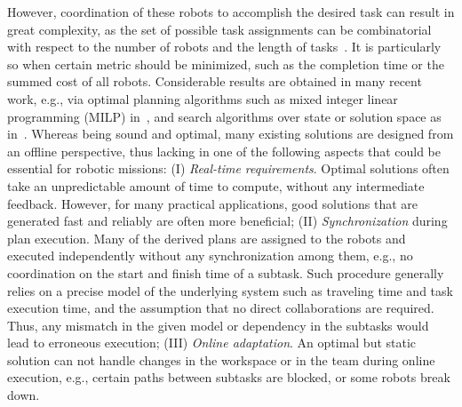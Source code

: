 However, coordination of these robots to accomplish the desired task can result in great complexity,
as the set of possible task assignments can be combinatorial with respect to the number of robots
and the length of tasks~\cite{toth2002overview}.
It is particularly so when certain metric should be minimized,
such as the completion time or the summed cost of all robots.
Considerable results are obtained in many recent work, e.g.,
via optimal planning algorithms
such as mixed integer linear programming (MILP) in~\cite{luo2021temporal,
 sahin2019multirobot, jones2019scratchs},
and search algorithms over state or solution space as
in~\cite{kantaros2020stylus, schillinger2018simultaneous, luo2021abstraction}.
Whereas being sound and optimal,
many existing solutions are designed from an offline perspective,
thus lacking in one of the following aspects that could be essential for robotic missions:
(I) \emph{Real-time requirements}.
Optimal solutions often take an unpredictable amount of time to compute,
without any intermediate feedback.
However, for many practical applications,
good solutions that are generated fast and reliably are often more beneficial;
(II) \emph{Synchronization} during plan execution.
Many of the derived plans are assigned to the robots
and executed independently without any synchronization among them,
e.g., no coordination on the start and finish time of a subtask.
Such procedure generally relies on a precise model of the underlying system
such as traveling time and task execution time,
and the assumption that no direct collaborations are required.
Thus, any mismatch in the given model or dependency in the subtasks would lead to erroneous execution;
(III) \emph{Online adaptation}.
An optimal but static solution can not handle changes in the workspace or in the team during
online execution, e.g., certain paths between subtasks are blocked, or some robots break down.


